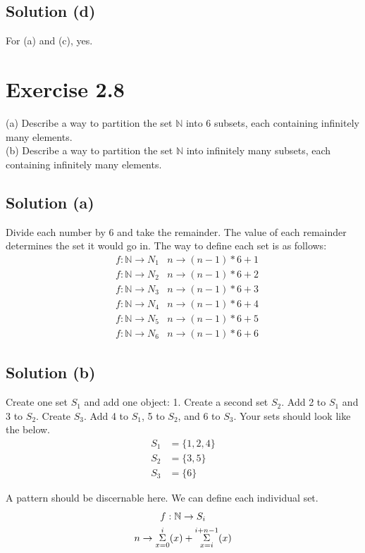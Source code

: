 \documentclass[12pt]{report}
\begin{document}
\subsection{Solution (d)}
For (a) and (c), yes.

\pagebreak
\section{Exercise 2.8}
(a) Describe a way to partition the set $\mathbb{N}$ into 6 subsets, each  containing infinitely many elements.\\ 
(b) Describe a way to partition the set $\mathbb{N}$ into infinitely many subsets, each containing infinitely many elements.

\subsection{Solution (a)}
Divide each number by 6 and take the remainder. 
The value of each remainder determines the set it would go in. The way to define each set is as follows:
\begin{align}
    &f: \mathbb{N} \to N_1  &n \to (n-1)*6 + 1\\
    &f: \mathbb{N} \to N_2  &n \to (n-1)*6 + 2\\
    &f: \mathbb{N} \to N_3  &n \to (n-1)*6 + 3\\
    &f: \mathbb{N} \to N_4  &n \to (n-1)*6 + 4\\
    &f: \mathbb{N} \to N_5  &n \to (n-1)*6 + 5\\
    &f: \mathbb{N} \to N_6  &n \to (n-1)*6 + 6
\end{align}

\subsection{Solution (b)}
Create one set $S_1$ and add one object: 1.
Create a second set $S_2$. 
Add 2 to $S_1$ and 3 to $S_2$.
Create $S_3$.
Add 4 to $S_1$, 5 to $S_2$, and 6 to $S_3$.
Your sets should look like the below.
\begin{align}
    S_1 &=  \{1,2,4\}\\
    S_2 &=  \{3,5\}\\
    S_3 &=  \{6\}
\end{align}

A pattern should be discernable here. 
We can define each individual set.
\begin{gather}
    f: \mathbb{N} \to S_i\\
    n \to \overunderset{i}{x = 0}{\Sigma} (x) + \overunderset{i + n - 1}{x = i}{\Sigma} (x) 
\end{gather}
\end{document}
